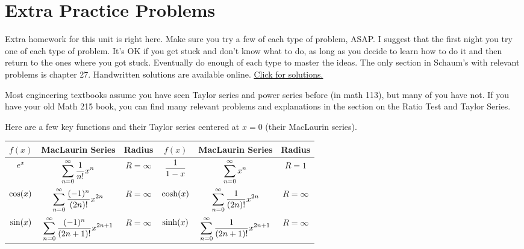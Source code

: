 

\section{Extra Practice Problems}

Extra homework for this unit is right here.
Make sure you try a few of each type of problem, ASAP. I suggest that the first night you try one of each type of problem. It's OK if you get stuck and don't know what to do, as long as you decide to learn how to do it and then return to the ones where you got stuck. Eventually do enough of each type to master the ideas.  The only section in Schaum's with relevant problems is chapter 27.  Handwritten solutions are available online.  \href{https://content.byui.edu/file/664390b8-e9cc-43a4-9f3c-70362f8b9735/1/08-Power-Series-Preparation-Solutions.pdf}{Click for solutions.}

Most engineering textbooks assume you have seen Taylor series and power series before (in math 113), but many of you have not. If you have your old Math 215 book, you can find many relevant problems and explanations in the section on the Ratio Test and Taylor Series.  

Here are a few key functions and their Taylor series centered at $x=0$ (their MacLaurin series).
\begin{center}
\begin{tabular}{|c|c|c||c|c|c|}\hline
$f(x)$ & MacLaurin Series & Radius&$f(x)$ & MacLaurin Series & Radius\\\hline
$\displaystyle e^x$ & $ \displaystyle\sum_{n=0}^\infty \frac{1}{n!}x^n$& $R=\infty$&
$\displaystyle \frac{1}{1-x} $&$   \displaystyle\sum_{n=0}^\infty x^n$& $R=1$\\\hline
$\displaystyle \cos(x) $&$  \displaystyle \sum_{n=0}^\infty \frac{(-1)^n}{(2n)!}x^{2n}$& $R=\infty$&
$\displaystyle \cosh(x) $&$   \displaystyle\sum_{n=0}^\infty \frac{1}{(2n)!}x^{2n}$& $R=\infty$\\\hline
$\displaystyle \sin(x) $&$   \displaystyle\sum_{n=0}^\infty \frac{(-1)^n}{(2n+1)!}x^{2n+1}$& $R=\infty$&
$\displaystyle \sinh(x)$&$  \displaystyle\sum_{n=0}^\infty \frac{1}{(2n+1)!}x^{2n+1}$& $R=\infty$\\\hline
\end{tabular} 
\end{center}




